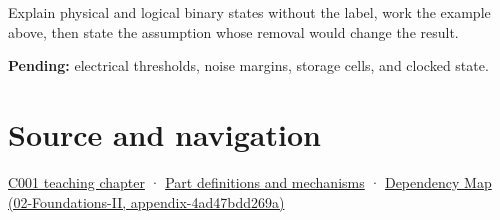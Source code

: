 Explain physical and logical binary states without the label, work the example above, then state the assumption whose removal would change the result.

\textbf{Pending:} electrical thresholds, noise margins, storage cells, and clocked state.

\section{Source and navigation}\label{appendix-ea798b1ceb35-source-and-navigation}

\href{Continuous\%20Notes/Computing\%20Foundations\%20-\%20From\%20Bits\%20to\%20C++\%20and\%20Systems\%20APIs\#From\%20a\%20signal\%20to\%20an\%20interpretation}{C001 teaching chapter} · \hyperref[appendix-fd090d982a15]{Part definitions and mechanisms} · \href{../02-Foundations-II/main.pdf\#nameddest=appendix-4ad47bdd269a}{Dependency Map (02-Foundations-II, appendix-4ad47bdd269a)}
